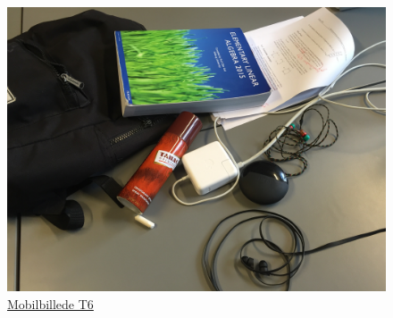 \begin{figure}[!h]
\begin{minipage}[b]{0.3\linewidth}
\label{fig:T5}
\end{minipage}
\hspace{0.5cm}
\begin{minipage}[b]{0.3\linewidth}
\centering
\includegraphics[width=\textwidth]{Billeder/test_billeder/T6.jpg}
\caption{\href{https://www.dropbox.com/home/P1\%20-\%20B205/vejleder/billeder/Mobilbilleder/T6?preview=T6.jpg}{Mobilbillede T6}}
\label{fig:T6}
\end{minipage}
\end{figure}

